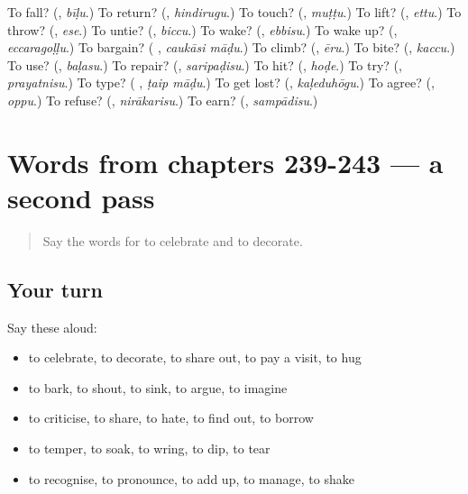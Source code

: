 \begin{tcolorbox}[breakable,colback=teal!4,colframe=teal!35!black,title={Before you move on}]
To fall? (\textbf{}, \emph{bīḷu}.) To return? (\textbf{}, \emph{hindirugu}.) To touch? (\textbf{}, \emph{muṭṭu}.) To lift? (\textbf{}, \emph{ettu}.) To throw? (\textbf{}, \emph{ese}.) To untie? (\textbf{}, \emph{biccu}.) To wake? (\textbf{}, \emph{ebbisu}.) To wake up? (\textbf{}, \emph{eccaragoḷḷu}.) To bargain? (\textbf{ }, \emph{caukāsi māḍu}.) To climb? (\textbf{}, \emph{ēru}.) To bite? (\textbf{}, \emph{kaccu}.) To use? (\textbf{}, \emph{baḷasu}.) To repair? (\textbf{}, \emph{saripaḍisu}.) To hit? (\textbf{}, \emph{hoḍe}.) To try? (\textbf{}, \emph{prayatnisu}.) To type? (\textbf{ }, \emph{ṭaip māḍu}.) To get lost? (\textbf{}, \emph{kaḷeduhōgu}.) To agree? (\textbf{}, \emph{oppu}.) To refuse? (\textbf{}, \emph{nirākarisu}.) To earn? (\textbf{}, \emph{sampādisu}.)
\end{tcolorbox}
\section[(dialogue)]{Words from chapters 239-243 — a second pass}

\label{lesson:KA-R243-second-pass-words-from-chapters-239-243}



\begin{quote}
Say the words for to celebrate and to decorate.
\end{quote}

\subsection*{Your turn}
Say these aloud:

\begin{itemize}
\raggedright
  \item to celebrate, to decorate, to share out, to pay a visit, to hug
  \item to bark, to shout, to sink, to argue, to imagine
  \item to criticise, to share, to hate, to find out, to borrow
  \item to temper, to soak, to wring, to dip, to tear
  \item to recognise, to pronounce, to add up, to manage, to shake
\end{itemize}

